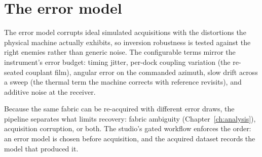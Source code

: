 \section{The error model}

The error model corrupts ideal simulated acquisitions with the
distortions the physical machine actually exhibits, so inversion
robustness is tested against the right enemies rather than generic
noise. The configurable terms mirror the instrument's error budget:
timing jitter, per-dock coupling variation (the re-seated couplant
film), angular error on the commanded azimuth, slow drift across a
sweep (the thermal term the machine corrects with reference
revisits), and additive noise at the receiver.

Because the same fabric can be re-acquired with different error
draws, the pipeline separates what limits recovery: fabric ambiguity
(Chapter~\ref{ch:analysis}), acquisition corruption, or both. The
studio's gated workflow enforces the order: an error model is chosen
before acquisition, and the acquired dataset records the model that
produced it.
